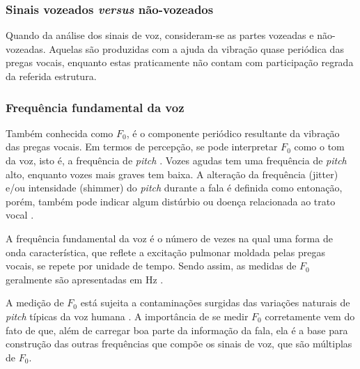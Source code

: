 		\subsubsection{Sinais vozeados \textit{versus} não-vozeados}
			\par Quando da análise dos sinais de voz, consideram-se as partes vozeadas e não-vozeadas. Aquelas são produzidas com a ajuda da vibração quase periódica das pregas vocais, enquanto estas praticamente não contam com participação regrada da referida estrutura.
		
		\subsubsection{Frequência fundamental da voz}
			\par Também conhecida como $F_0$, é o componente periódico resultante da vibração das pregas vocais. Em termos de percepção, se pode interpretar $F_0$ como o tom da voz, isto é, a frequência de \textit{pitch} \cite{kremer2014eficiencia}. Vozes agudas tem uma frequência de \textit{pitch} alto, enquanto vozes mais graves tem baixa. A alteração da frequência (jitter) e/ou intensidade (shimmer) do \textit{pitch} durante a fala é definida como entonação,  porém, também pode indicar algum distúrbio ou doença relacionada ao trato vocal \cite{WERTZNER2005}.
			
			\par A frequência fundamental da voz é o número de vezes na qual uma forma de onda característica, que reflete a excitação pulmonar moldada pelas pregas vocais, se repete por unidade de tempo. Sendo assim, as medidas de $F_0$ geralmente são apresentadas em Hz \cite{freitas2013avaliaccao}.
			
			\par A medição de $F_0$ está sujeita a contaminações surgidas das variações naturais de \textit{pitch} típicas da voz humana \cite{freitas2013avaliaccao}. A importância de se medir $F_0$ corretamente vem do fato de que, além de carregar boa parte da informação da fala, ela é a base para construção das outras frequências que compõe os sinais de voz, que são múltiplas de $F_0$.
		
